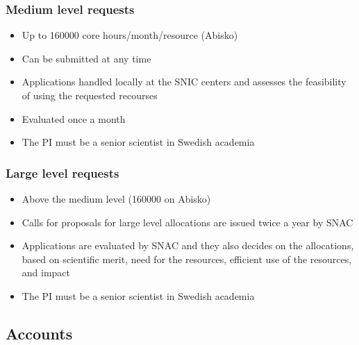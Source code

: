 \begin{frame}
	\frametitle{Medium level requests}
  
	\begin{itemize}
		\item	Up to 160000 core hours/month/resource (Abisko)
		\item	Can be submitted at any time
		\item	Applications handled locally at the SNIC centers
				and assesses the feasibility of using the requested recourses
		\item	Evaluated once a month
		\item	The PI must be a senior scientist in Swedish academia
	\end{itemize}

\end{frame}

\begin{frame}
	\frametitle{Large level requests}
  
	\begin{itemize}
		\item	Above the medium level (160000 on Abisko)
		\item	Calls for proposals for large level allocations
				are issued twice a year by SNAC
		\item	Applications are evaluated by SNAC and they also decides on the
				allocations, based on scientific merit, need for the resources,
				efficient use of the resources, and impact
		\item	The PI must be a senior scientist in Swedish academia
	\end{itemize}

\end{frame}


\subsection{Accounts}

